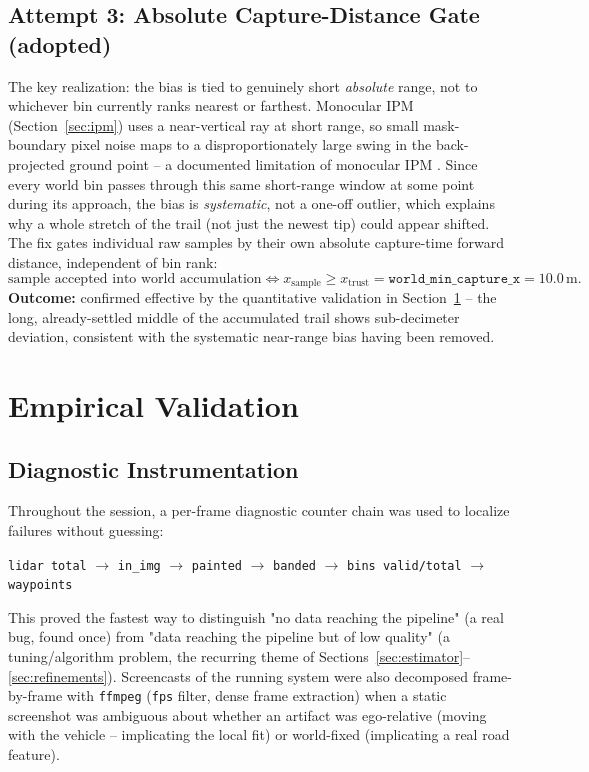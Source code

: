 \documentclass[11pt]{article}
\newcommand{\code}[1]{\texttt{#1}}
\begin{document}
\subsection{Attempt 3: Absolute Capture-Distance Gate (adopted)}
The key realization: the bias is tied to genuinely short \emph{absolute} range, not to whichever
bin currently ranks nearest or farthest. Monocular IPM (Section~\ref{sec:ipm}) uses a
near-vertical ray at short range, so small mask-boundary pixel noise maps to a disproportionately
large swing in the back-projected ground point -- a documented limitation of monocular IPM
\citep{ipm2021}. Since every world bin passes through this same short-range window at some point
during its approach, the bias is \emph{systematic}, not a one-off outlier, which explains why a
whole stretch of the trail (not just the newest tip) could appear shifted. The fix gates
individual raw samples by their own absolute capture-time forward distance, independent of bin
rank:
\begin{equation}
\text{sample accepted into world accumulation} \iff x_{\text{sample}} \ge x_{\text{trust}}
= \code{world\_min\_capture\_x} = 10.0\,\mathrm{m}.
\label{eq:capturegate}
\end{equation}
\textbf{Outcome:} confirmed effective by the quantitative validation in
Section~\ref{sec:validation} -- the long, already-settled middle of the accumulated trail shows
sub-decimeter deviation, consistent with the systematic near-range bias having been removed.

\section{Empirical Validation}
\label{sec:validation}

\subsection{Diagnostic Instrumentation}
Throughout the session, a per-frame diagnostic counter chain was used to localize failures without
guessing:
\begin{center}
\code{lidar\ total} $\to$ \code{in\_img} $\to$ \code{painted} $\to$ \code{banded} $\to$ \code{bins valid/total} $\to$ \code{waypoints}
\end{center}
This proved the fastest way to distinguish "no data reaching the pipeline" (a real bug, found once)
from "data reaching the pipeline but of low quality" (a tuning/algorithm problem, the recurring
theme of Sections~\ref{sec:estimator}--\ref{sec:refinements}). Screencasts of the running system
were also decomposed frame-by-frame with \code{ffmpeg} (\code{fps} filter, dense frame extraction)
when a static screenshot was ambiguous about whether an artifact was ego-relative (moving with the
vehicle -- implicating the local fit) or world-fixed (implicating a real road feature).
\end{document}
